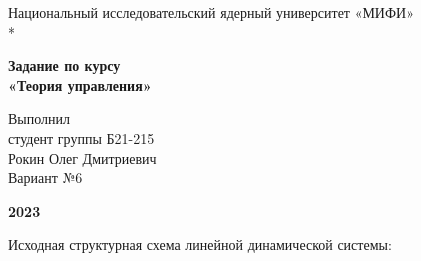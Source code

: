 \documentclass[a4paper,12pt]{article}
\renewcommand{\^}[2]{#1^{\, #2} \kern -1pt}
\newcommand{\1}{\kern 1pt}
\newcommand{\0}{\kern -1pt}
\begin{document}
	
	\begin{titlepage}
		\begin{center}
			\small{Национальный исследовательский ядерный университет «МИФИ»}\\*
		\end{center}
		\vspace{7cm}
		
		\begin{center}
			\Large{\textbf{Задание по курсу}\\
				\textbf{«Теория управления»}}
		\end{center}
		\vspace{2cm}
		
		\begin{flushright}
			Выполнил\\
			студент группы Б21-215\\
			Рокин Олег Дмитриевич\\
			\vspace{0.5cm}
			Вариант №6
		\end{flushright}
		\vspace{8cm}
		
		\begin{center}
			\textbf{2023}
		\end{center}
	\end{titlepage}


	\newpage 
	\setcounter{page}{2}
	
	
	Исходная структурная схема линейной динамической системы:
	
\end{document}
